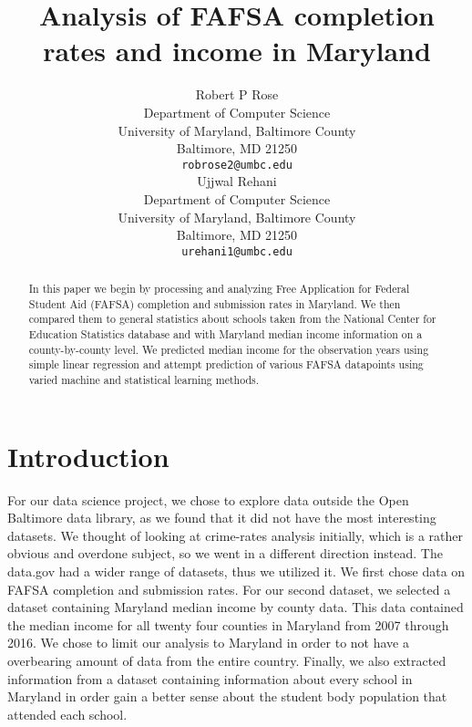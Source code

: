 \documentclass[12pt]{article}
\title{Analysis of FAFSA completion rates and income in Maryland}
\author{
  Robert P Rose \\
  Department of Computer Science\\
  University of Maryland, Baltimore County\\
  Baltimore, MD 21250 \\
  \texttt{robrose2@umbc.edu} \\
   \And
  Ujjwal Rehani \\
  Department of Computer Science\\
  University of Maryland, Baltimore County\\
  Baltimore, MD 21250 \\
  \texttt{urehani1@umbc.edu} \\
}
\begin{document}
\maketitle

\begin{abstract}
In this paper we begin by processing and analyzing Free Application for Federal
Student Aid (FAFSA) completion and submission rates in Maryland. We then compared them to 
general statistics about schools taken from the National Center for Education 
Statistics database and with Maryland median income information on a 
county-by-county level. We predicted median income for the observation years using 
simple linear regression and attempt prediction of various FAFSA datapoints using 
varied machine and statistical learning methods. \\
\end{abstract}

\section{Introduction}
For our data science project, we chose to explore data outside the Open Baltimore
data library, as we found that it did not have the most interesting datasets. We thought of looking at crime-rates analysis initially, which is a rather obvious and overdone subject, so we went in a different direction instead. The data.gov had a wider range of datasets, thus we utilized it.  We first chose data on FAFSA completion and submission rates. For our second dataset, we selected a dataset containing Maryland median income by county data. This data contained the median income for all twenty four counties in Maryland from 2007 through 2016. We chose to limit our analysis to Maryland in order to not have a overbearing amount of data from the entire country. Finally, we also extracted information from a dataset containing information about every school in Maryland in order gain a better sense about the student body population that attended each school.
\end{document}

